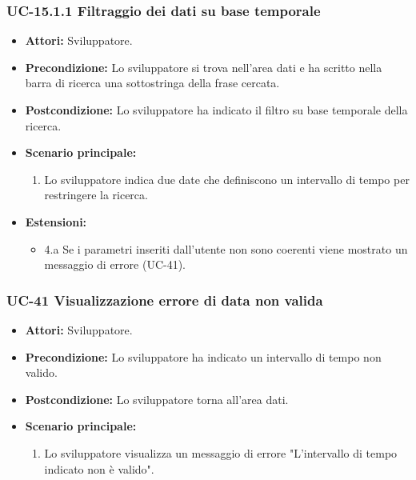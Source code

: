 	\subsubsection{UC-15.1.1 Filtraggio dei dati su base temporale}	
		\begin{itemize}
			\item \textbf{Attori:} Sviluppatore.
			\item \textbf{Precondizione:} Lo sviluppatore si trova nell'area dati e ha scritto nella barra di ricerca una sottostringa della frase cercata.
			\item \textbf{Postcondizione:} Lo sviluppatore ha indicato il filtro su base temporale della ricerca.
			\item \textbf{Scenario principale:}
				\begin{enumerate}
					\item Lo sviluppatore indica due date che definiscono un intervallo di tempo per restringere la ricerca.
				\end{enumerate}
			\item \textbf{Estensioni:}
				\begin{itemize}
					\item 4.a Se i parametri inseriti dall'utente non sono coerenti viene mostrato un messaggio di errore (UC-41).
				\end{itemize}		
		\end{itemize}
			
	\subsubsection{UC-41 Visualizzazione errore di data non valida}
		\begin{itemize}					
			\item \textbf{Attori:} Sviluppatore.
			\item \textbf{Precondizione:} Lo sviluppatore ha indicato un intervallo di tempo non valido.
			\item \textbf{Postcondizione:} Lo sviluppatore torna all'area dati.
			\item \textbf{Scenario principale:}
				\begin{enumerate}
					\item Lo sviluppatore visualizza un messaggio di errore "L'intervallo di tempo indicato non è valido".
				\end{enumerate}	
		\end{itemize}					
						
